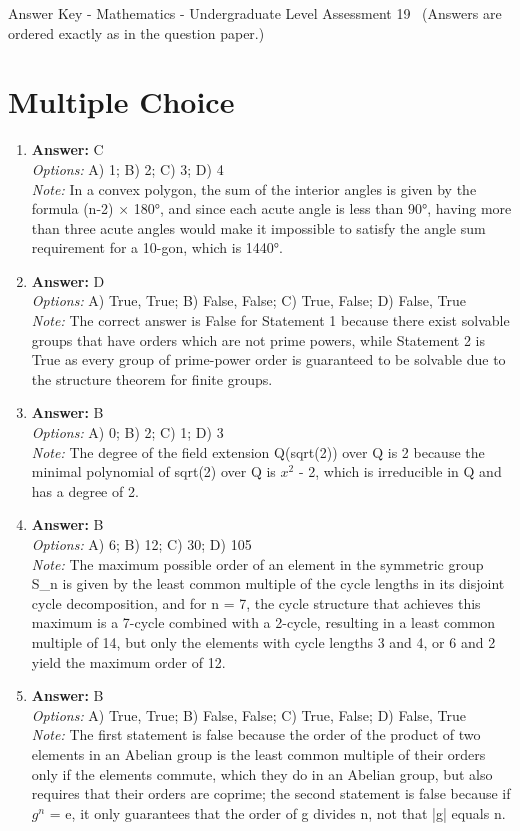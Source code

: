 \documentclass[12pt]{article}
\begin{document}
\begin{center}
Answer Key - Mathematics - Undergraduate Level Assessment 19 \
\small (Answers are ordered exactly as in the question paper.)
\end{center}

\section*{Multiple Choice}
\begin{enumerate}[label=\arabic*.]
\item \textbf{Answer:} C
\\ \textit{Options:} A) 1; B) 2; C) 3; D) 4
\\ \textit{Note:} In a convex polygon, the sum of the interior angles is given by the formula (n-2) × 180°, and since each acute angle is less than 90°, having more than three acute angles would make it impossible to satisfy the angle sum requirement for a 10-gon, which is 1440°.
\item \textbf{Answer:} D
\\ \textit{Options:} A) True, True; B) False, False; C) True, False; D) False, True
\\ \textit{Note:} The correct answer is False for Statement 1 because there exist solvable groups that have orders which are not prime powers, while Statement 2 is True as every group of prime-power order is guaranteed to be solvable due to the structure theorem for finite groups.
\item \textbf{Answer:} B
\\ \textit{Options:} A) 0; B) 2; C) 1; D) 3
\\ \textit{Note:} The degree of the field extension Q(sqrt(2)) over Q is 2 because the minimal polynomial of sqrt(2) over Q is $x^2$ - 2, which is irreducible in Q and has a degree of 2.
\item \textbf{Answer:} B
\\ \textit{Options:} A) 6; B) 12; C) 30; D) 105
\\ \textit{Note:} The maximum possible order of an element in the symmetric group S\_n is given by the least common multiple of the cycle lengths in its disjoint cycle decomposition, and for n = 7, the cycle structure that achieves this maximum is a 7-cycle combined with a 2-cycle, resulting in a least common multiple of 14, but only the elements with cycle lengths 3 and 4, or 6 and 2 yield the maximum order of 12.
\item \textbf{Answer:} B
\\ \textit{Options:} A) True, True; B) False, False; C) True, False; D) False, True
\\ \textit{Note:} The first statement is false because the order of the product of two elements in an Abelian group is the least common multiple of their orders only if the elements commute, which they do in an Abelian group, but also requires that their orders are coprime; the second statement is false because if $g^n$ = e, it only guarantees that the order of g divides n, not that |g| equals n.
\end{enumerate}
\end{document}
